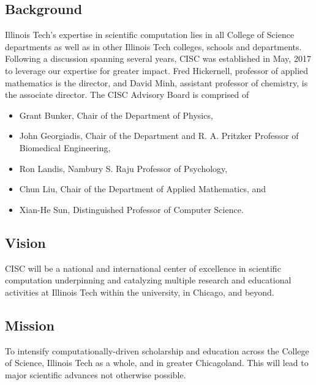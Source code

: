 \documentclass[12pt]{amsart}
\begin{document}
\subsection*{Background} Illinois Tech's expertise in scientific computation lies in all College of Science departments as well as in other Illinois Tech colleges, schools and departments.  Following a discussion spanning several years, CISC was established in May, 2017 to leverage our expertise for greater impact.  Fred Hickernell, professor of applied mathematics is the director, and David Minh, assistant professor of chemistry, is the associate director.  The CISC Advisory Board is comprised of 
\begin{itemize}
    \item Grant Bunker, Chair of the Department of Physics, 
    \item John Georgiadis, Chair of  the Department and R. A. Pritzker Professor of Biomedical Engineering,
    
    \item Ron Landis, 
Nambury S. Raju Professor of Psychology,

    \item Chun Liu, Chair of the Department of Applied Mathematics, and

    \item Xian-He Sun, Distinguished Professor of Computer Science.
\end{itemize}

\subsection*{Vision}
CISC will be a national and international center of excellence in scientific computation underpinning and catalyzing multiple research and educational activities at Illinois Tech within the university, in Chicago, and beyond.

\subsection*{Mission}
To intensify computationally-driven scholarship and education across the College of Science, Illinois Tech as a whole, and in greater Chicagoland.  This will lead to major scientific advances not otherwise possible.
\end{document}
